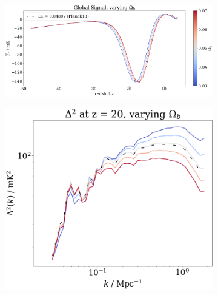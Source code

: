 \documentclass[floats,floatfix,showpacs,amssymb,prd,superscriptaddress,nofootinbib]{revtex4-2} %
\begin{document}
\begin{figure}[H]
     \centering
     \begin{subfigure}[b]{0.9\textwidth}
         \centering
         \includegraphics[width=\textwidth]{images/simulation_results/global_signal_Ob.png}
         \label{fig:global_signal_Ob}
     \end{subfigure}
     \hfill
     \begin{subfigure}[b]{0.45\textwidth}
         \centering
         \includegraphics[width=\textwidth]{images/simulation_results/power_spectrum_fixed_z_20_Ob.png}
         \label{fig:power_spectrum_fixed_z_20_Ob}
     \end{subfigure}
     \hfill
     \begin{subfigure}[b]{0.45\textwidth}
         \centering

\end{subfigure}
\end{figure}
\end{document}
